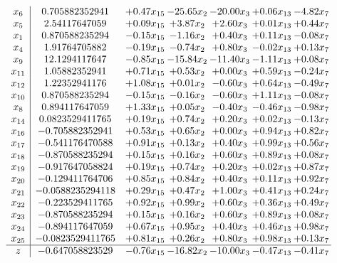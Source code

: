\documentclass[8pt]{article}
\begin{document}
\[\begin{array}{c| c c@{\hskip 2pt} c@{\hskip 2pt} c@{\hskip 2pt} c@{\hskip 2pt} c@{\hskip 2pt} }
 x_{6}   &  0.705882352941 & +  0.47 x_{15} & -25.65 x_{2} & -20.00 x_{3} & +  0.06 x_{13} & -4.82 x_{7}\\
 x_{5}   &  2.54117647059 & +  0.09 x_{15} & +  3.87 x_{2} & +  2.60 x_{3} & +  0.01 x_{13} & +  0.44 x_{7}\\
 x_{1}   &  0.870588235294 & -0.15 x_{15} & -1.16 x_{2} & +  0.40 x_{3} & +  0.11 x_{13} & -0.08 x_{7}\\
 x_{4}   &  1.91764705882 & -0.19 x_{15} & -0.74 x_{2} & +  0.80 x_{3} & -0.02 x_{13} & +  0.13 x_{7}\\
 x_{9}   &  12.1294117647 & -0.85 x_{15} & -15.84 x_{2} & -11.40 x_{3} & -1.11 x_{13} & +  0.08 x_{7}\\
 x_{11}   &  1.05882352941 & +  0.71 x_{15} & +  0.53 x_{2} & +  0.00 x_{3} & +  0.59 x_{13} & -0.24 x_{7}\\
 x_{12}   &  1.22352941176 & +  1.08 x_{15} & +  0.01 x_{2} & -0.60 x_{3} & +  0.64 x_{13} & -0.49 x_{7}\\
 x_{10}   &  0.870588235294 & -0.15 x_{15} & -0.16 x_{2} & -0.60 x_{3} & +  1.11 x_{13} & -0.08 x_{7}\\
 x_{8}   &  0.894117647059 & +  1.33 x_{15} & +  0.05 x_{2} & -0.40 x_{3} & -0.46 x_{13} & -0.98 x_{7}\\
 x_{14}   &  0.0823529411765 & +  0.19 x_{15} & +  0.74 x_{2} & +  0.20 x_{3} & +  0.02 x_{13} & -0.13 x_{7}\\
 x_{16}   &  -0.705882352941 & +  0.53 x_{15} & +  0.65 x_{2} & +  0.00 x_{3} & +  0.94 x_{13} & +  0.82 x_{7}\\
 x_{17}   &  -0.541176470588 & +  0.91 x_{15} & +  0.13 x_{2} & +  0.40 x_{3} & +  0.99 x_{13} & +  0.56 x_{7}\\
 x_{18}   &  -0.870588235294 & +  0.15 x_{15} & +  0.16 x_{2} & +  0.60 x_{3} & +  0.89 x_{13} & +  0.08 x_{7}\\
 x_{19}   &  -0.917647058824 & +  0.19 x_{15} & +  0.74 x_{2} & +  0.20 x_{3} & +  0.02 x_{13} & +  0.87 x_{7}\\
 x_{20}   &  -0.129411764706 & +  0.85 x_{15} & +  0.84 x_{2} & +  0.40 x_{3} & +  0.11 x_{13} & +  0.92 x_{7}\\
 x_{21}   &  -0.0588235294118 & +  0.29 x_{15} & +  0.47 x_{2} & +  1.00 x_{3} & +  0.41 x_{13} & +  0.24 x_{7}\\
 x_{22}   &  -0.223529411765 & +  0.92 x_{15} & +  0.99 x_{2} & +  0.60 x_{3} & +  0.36 x_{13} & +  0.49 x_{7}\\
 x_{23}   &  -0.870588235294 & +  0.15 x_{15} & +  0.16 x_{2} & +  0.60 x_{3} & +  0.89 x_{13} & +  0.08 x_{7}\\
 x_{24}   &  -0.894117647059 & +  0.67 x_{15} & +  0.95 x_{2} & +  0.40 x_{3} & +  0.46 x_{13} & +  0.98 x_{7}\\
 x_{25}   &  -0.0823529411765 & +  0.81 x_{15} & +  0.26 x_{2} & +  0.80 x_{3} & +  0.98 x_{13} & +  0.13 x_{7}\\
\hline
z    &  -0.647058823529 & -0.76 x_{15} & -16.82 x_{2} & -10.00 x_{3} & -0.47 x_{13} & -0.41 x_{7}\\
\end{array}\]
\end{document}

